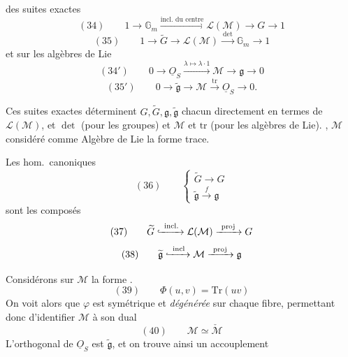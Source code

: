 \documentclass[11pt,a4paper]{article}
\begin{document}
  des suites exactes
\[
  (34) \qquad 1 \longrightarrow \mathbb{G}_m \xrightarrow{\text{incl.\ du centre}}
  \mathcal{L}(\mathcal{M}) \longrightarrow G \longrightarrow 1
\]
\[
  (35) \qquad 1 \longrightarrow \widetilde{G} \longrightarrow \mathcal{L}(\mathcal{M})
  \xrightarrow{\ \det\ } \mathbb{G}_m \longrightarrow 1
\]
et sur les algèbres de Lie
\[
  (34') \qquad 0 \longrightarrow \underline{O}_S \xrightarrow{\lambda \mapsto \lambda \cdot 1}
  \mathcal{M} \longrightarrow \mathfrak{g} \longrightarrow 0
\]
\[
  (35') \qquad 0 \longrightarrow \widetilde{\mathfrak{g}} \longrightarrow \mathcal{M}
  \xrightarrow{\ \mathrm{tr}\ } \underline{O}_S \longrightarrow 0 .
\]

Ces suites exactes déterminent $G, \widetilde{G}, \mathfrak{g}, \widetilde{\mathfrak{g}}$
chacun directement en termes de $\mathcal{L}(\mathcal{M})$, et $\det$ (pour les
groupes) et $\mathcal{M}$ et $\mathrm{tr}$ (pour les algèbres de Lie).
 , $\mathcal{M}$  considéré comme
Algèbre de Lie  la forme trace.

Les hom.\ canoniques
\[
  (36) \qquad \left\lbrace
  \begin{array}{l}
    \widetilde{G} \longrightarrow G \\
    \widetilde{\mathfrak{g}} \xrightarrow{\ f\ } \mathfrak{g}
  \end{array}\right.
\]
sont les composés
\[
  (37) \qquad \widetilde{G} \xhookrightarrow{\ \mathrm{incl.}\ } \mathcal{L}(\mathcal{M})
  \xrightarrow{\ \mathrm{proj}\ } G
\]
\[
  (38) \qquad \widetilde{\mathfrak{g}} \xhookrightarrow{\ \mathrm{incl}\ } \mathcal{M}
  \xrightarrow{\ \mathrm{proj}\ } \mathfrak{g}
\]

Considérons sur $\mathcal{M}$ la forme  
\struck{\ill{}}.
\[
  (39) \qquad \Phi(u, v) = \mathrm{Tr}(uv)
\]
On voit alors que $\varphi$ est symétrique et  \emph{dégénérée} sur
chaque fibre, permettant donc d'identifier $\mathcal{M}$ à son dual
\[
  (40) \qquad \mathcal{M} \simeq \check{\mathcal{M}}
\]
L'orthogonal de $\underline{O}_S$ est $\widetilde{\mathfrak{g}}$, et on trouve ainsi
un accouplement 
\end{document}
